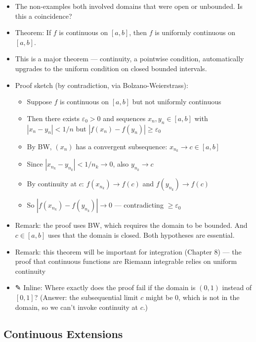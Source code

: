 \documentclass[
  10pt,
  letterpaper,
]{scrbook}
\providecommand{\tightlist}{%
  \setlength{\itemsep}{0pt}\setlength{\parskip}{0pt}}
\begin{document}
\begin{itemize}
\tightlist
\item
  The non-examples both involved domains that were open or unbounded. Is
  this a coincidence?
\item
  Theorem: If \(f\) is continuous on \([a,b]\), then \(f\) is uniformly
  continuous on \([a,b]\).
\item
  This is a major theorem --- continuity, a pointwise condition,
  automatically upgrades to the uniform condition on closed bounded
  intervals.
\item
  Proof sketch (by contradiction, via Bolzano-Weierstrass):

  \begin{itemize}
  \tightlist
  \item
    Suppose \(f\) is continuous on \([a,b]\) but not uniformly
    continuous
  \item
    Then there exists \(\varepsilon_0 > 0\) and sequences
    \(x_n, y_n \in [a,b]\) with \(|x_n - y_n| < 1/n\) but
    \(|f(x_n) - f(y_n)| \geq \varepsilon_0\)
  \item
    By BW, \((x_n)\) has a convergent subsequence:
    \(x_{n_k} \to c \in [a,b]\)
  \item
    Since \(|x_{n_k} - y_{n_k}| < 1/n_k \to 0\), also \(y_{n_k} \to c\)
  \item
    By continuity at \(c\): \(f(x_{n_k}) \to f(c)\) and
    \(f(y_{n_k}) \to f(c)\)
  \item
    So \(|f(x_{n_k}) - f(y_{n_k})| \to 0\) --- contradicting
    \(\geq \varepsilon_0\)
  \end{itemize}
\item
  Remark: the proof uses BW, which requires the domain to be bounded.
  And \(c \in [a,b]\) uses that the domain is closed. Both hypotheses
  are essential.
\item
  Remark: this theorem will be important for integration (Chapter 8) ---
  the proof that continuous functions are Riemann integrable relies on
  uniform continuity
\item
  ✎ Inline: Where exactly does the proof fail if the domain is
  \((0, 1)\) instead of \([0, 1]\)? (Answer: the subsequential limit
  \(c\) might be \(0\), which is not in the domain, so we can't invoke
  continuity at \(c\).)
\end{itemize}

\subsection{Continuous Extensions}\label{continuous-extensions}
\end{document}
